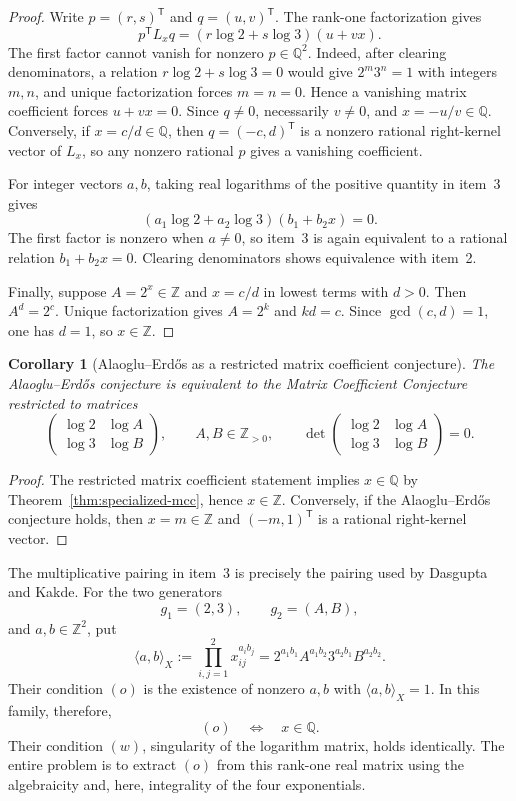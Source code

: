 \documentclass[11pt,oneside]{article}
\newtheorem{corollary}[theorem]{Corollary}
\theoremstyle{definition}
\theoremstyle{remark}
\newcommand{\Z}{\mathbb Z}
\newcommand{\Q}{\mathbb Q}
\begin{document}
\begin{proof}
Write $p=(r,s)^{\mathsf T}$ and $q=(u,v)^{\mathsf T}$.  The rank-one factorization gives
\[
  p^{\mathsf T}L_xq
  =(r\log2+s\log3)(u+vx).
\]
The first factor cannot vanish for nonzero $p\in\Q^2$.  Indeed, after clearing
denominators, a relation $r\log2+s\log3=0$ would give $2^m3^n=1$ with integers $m,n$, and
unique factorization forces $m=n=0$.  Hence a vanishing matrix coefficient forces
$u+vx=0$.  Since $q\ne0$, necessarily $v\ne0$, and $x=-u/v\in\Q$.  Conversely, if
$x=c/d\in\Q$, then $q=(-c,d)^{\mathsf T}$ is a nonzero rational right-kernel vector of
$L_x$, so any nonzero rational $p$ gives a vanishing coefficient.

For integer vectors $a,b$, taking real logarithms of the positive quantity in item~3 gives
\[
  (a_1\log2+a_2\log3)(b_1+b_2x)=0.
\]
The first factor is nonzero when $a\ne0$, so item~3 is again equivalent to a rational
relation $b_1+b_2x=0$.  Clearing denominators shows equivalence with item~2.

Finally, suppose $A=2^x\in\Z$ and $x=c/d$ in lowest terms with $d>0$.  Then
$A^d=2^c$.  Unique factorization gives $A=2^k$ and $kd=c$.  Since $\gcd(c,d)=1$, one has
$d=1$, so $x\in\Z$.
\end{proof}

\begin{corollary}[Alaoglu--Erd\H{o}s as a restricted matrix coefficient conjecture]
\label{cor:ae-restricted-mcc}
The Alaoglu--Erd\H{o}s conjecture is equivalent to the Matrix Coefficient Conjecture restricted
to matrices
\[
  \begin{pmatrix}\log2&\log A\\ \log3&\log B\end{pmatrix},
  \qquad A,B\in\Z_{>0},\qquad
  \det\begin{pmatrix}\log2&\log A\\ \log3&\log B\end{pmatrix}=0.
\]
\end{corollary}

\begin{proof}
The restricted matrix coefficient statement implies $x\in\Q$ by
Theorem~\ref{thm:specialized-mcc}, hence $x\in\Z$.  Conversely, if the Alaoglu--Erd\H{o}s
conjecture holds, then $x=m\in\Z$ and $(-m,1)^{\mathsf T}$ is a rational right-kernel vector.
\end{proof}

The multiplicative pairing in item~3 is precisely the pairing used by Dasgupta and Kakde.
For the two generators
\[
  g_1=(2,3),\qquad g_2=(A,B),
\]
and $a,b\in\Z^2$, put
\[
  \langle a,b\rangle_X
  :=\prod_{i,j=1}^2 x_{ij}^{a_i b_j}
  =2^{a_1b_1}A^{a_1b_2}3^{a_2b_1}B^{a_2b_2}.
\]
Their condition $(o)$ is the existence of nonzero $a,b$ with
$\langle a,b\rangle_X=1$.  In this family, therefore,
\[
  (o)\quad\Longleftrightarrow\quad x\in\Q.
\]
Their condition $(w)$, singularity of the logarithm matrix, holds identically.  The entire
problem is to extract $(o)$ from this rank-one real matrix using the algebraicity and, here,
integrality of the four exponentials.
\end{document}
